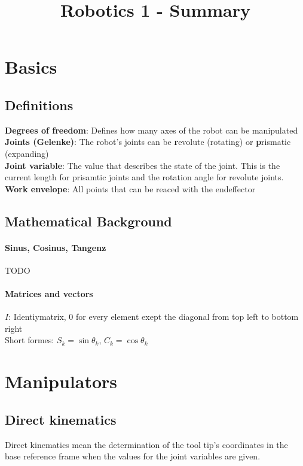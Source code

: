 \documentclass{article}
\begin{document}
	\title{Robotics 1 - Summary}
	\maketitle
	
	\newpage
	
	\tableofcontents
	
	\newpage
	
	\section{Basics}
	\subsection{Definitions}
	\textbf{Degrees of freedom}: Defines how many axes of the robot can be manipulated\\
	\textbf{Joints (Gelenke)}: The robot's joints can be \textbf{r}evolute (rotating) or \textbf{p}rismatic (expanding)\\
	\textbf{Joint variable}: The value that describes the state of the joint. This is the current length for prisamtic joints and the rotation angle for revolute joints.\\
	\textbf{Work envelope}: All points that can be reaced with the endeffector

	\subsection{Mathematical Background}
	\paragraph{Sinus, Cosinus, Tangenz}
	TODO
	\paragraph{Matrices and vectors}
	$I$: Identiymatrix, 0 for every element exept the diagonal from top left to bottom right\\
	Short formes: $S_{k} = \sin \theta_{k}$, $C_{k} = \cos \theta_{k}$
	
	\section{Manipulators}
	\subsection{Direct kinematics}
	Direct kinematics mean the determination of the tool tip's coordinates in the base reference frame when the values for the joint variables are given.
\end{document}
